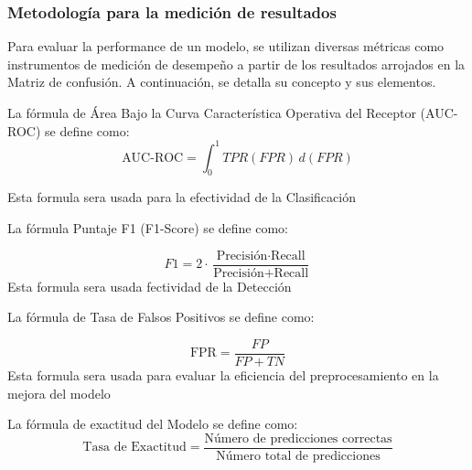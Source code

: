 	






\subsubsection{Metodología para la medición de resultados}

Para evaluar la performance de un modelo, se utilizan diversas métricas como instrumentos de medición de desempeño a partir de los resultados arrojados en la Matriz de confusión. A continuación, se detalla su concepto y sus elementos.


 



La fórmula de Área Bajo la Curva Característica Operativa del Receptor (AUC-ROC) se define como:
\begin{equation}
	\text{AUC-ROC} = \int_{0}^{1} TPR(FPR) \, d(FPR)
\end{equation}

Esta formula sera usada para la efectividad de la Clasificación





La fórmula Puntaje F1 (F1-Score) se define como:

\begin{equation}
	F1 = 2 \cdot \frac{\text{Precisión} \cdot \text{Recall}}{\text{Precisión} + \text{Recall}}
\end{equation}
Esta formula sera usada fectividad de la Detección




La fórmula de Tasa de Falsos Positivos se define como:

\begin{equation}
	\text{FPR} = \frac{FP}{FP + TN}
\end{equation}
Esta formula sera usada para evaluar la eficiencia del preprocesamiento en la mejora del modelo




La fórmula de exactitud del Modelo se define como:
\begin{equation}
	\text{Tasa de Exactitud} = \frac{\text{Número de predicciones correctas}}{\text{Número total de predicciones}}
\end{equation}

